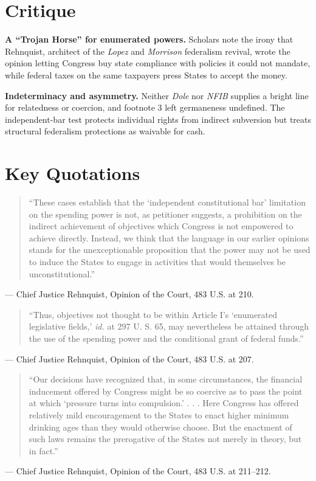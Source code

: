 \documentclass[12pt]{article}
\begin{document}
\section{Critique}

\textbf{A ``Trojan Horse'' for enumerated powers.} Scholars note the irony that Rehnquist, architect of the \textit{Lopez} and \textit{Morrison} federalism revival, wrote the opinion letting Congress buy state compliance with policies it could not mandate, while federal taxes on the same taxpayers press States to accept the money.

\textbf{Indeterminacy and asymmetry.} Neither \textit{Dole} nor \textit{NFIB} supplies a bright line for relatedness or coercion, and footnote 3 left germaneness undefined. The independent-bar test protects individual rights from indirect subversion but treats structural federalism protections as waivable for cash.

\section{Key Quotations}

\begin{quote}
``These cases establish that the `independent constitutional bar' limitation on the spending power is not, as petitioner suggests, a prohibition on the indirect achievement of objectives which Congress is not empowered to achieve directly. Instead, we think that the language in our earlier opinions stands for the unexceptionable proposition that the power may not be used to induce the States to engage in activities that would themselves be unconstitutional.''
\end{quote}
\noindent --- Chief Justice Rehnquist, Opinion of the Court, 483 U.S. at 210.

\begin{quote}
``Thus, objectives not thought to be within Article I's `enumerated legislative fields,' \textit{id.} at 297 U. S. 65, may nevertheless be attained through the use of the spending power and the conditional grant of federal funds.''
\end{quote}
\noindent --- Chief Justice Rehnquist, Opinion of the Court, 483 U.S. at 207.

\begin{quote}
``Our decisions have recognized that, in some circumstances, the financial inducement offered by Congress might be so coercive as to pass the point at which `pressure turns into compulsion.' . . . Here Congress has offered relatively mild encouragement to the States to enact higher minimum drinking ages than they would otherwise choose. But the enactment of such laws remains the prerogative of the States not merely in theory, but in fact.''
\end{quote}
\noindent --- Chief Justice Rehnquist, Opinion of the Court, 483 U.S. at 211--212.
\end{document}
